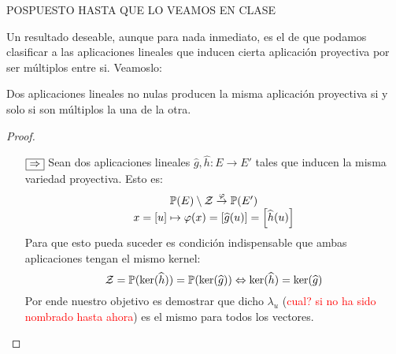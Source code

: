 POSPUESTO HASTA QUE LO VEAMOS EN CLASE

Un resultado deseable, aunque para nada inmediato, es el de que podamos clasificar a las aplicaciones lineales que inducen cierta aplicación proyectiva por ser múltiplos entre si. Veamoslo:
\begin{theo}
	\label{C4_teo_lemaCorrespondencia}
	Dos aplicaciones lineales no nulas producen la misma aplicación proyectiva si y solo si son múltiplos la una de la otra.
\end{theo}
\begin{proof}
	\begin{itemize}
		\item[$\fbox{$\Rightarrow$}$] Sean dos aplicaciones lineales $\widehat{g},\widehat{h}:E\to E'$ tales que inducen la misma variedad proyectiva. Esto es:
		\[\begin{array}{c}
		\mathbb{P}(E)\setminus\mathcal{Z}\stackrel{\varphi}{\to}\mathbb{P}(E')\\
		x=\left [ u \right ]\mapsto\varphi(x)=\left [ \widehat{g}(u) \right ]=\left [ \widehat{h}(u) \right ]
		\end{array}\]
		Para que esto pueda suceder es condición indispensable que ambas aplicaciones tengan el mismo kernel:
		\[\mathcal{Z}=\mathbb{P}(\ker(\widehat{h}))=\mathbb{P}(\ker(\widehat{g}))\Leftrightarrow \ker(\widehat{h})=\ker(\widehat{g})\]
		Por ende nuestro objetivo es demostrar que dicho $\lambda_u$ (\textcolor{red}{cual? si no ha sido nombrado hasta ahora}) es el mismo para todos los vectores.
		

\end{itemize}
\end{proof}
